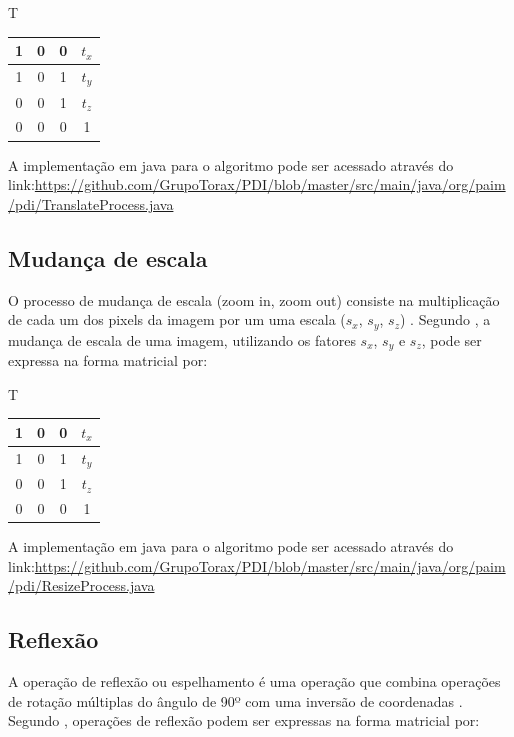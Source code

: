 \documentclass[
	12pt,				%
	oneside,			%
	a4paper,			%
	english,			%
	french,				%
	spanish,			%
	brazil,				%
	]{abntex2}
\begin{document}
T
\begin{tabular}{|c|c|c|c|}
	\hline
    1 & 0 & 0 & \(t_x\)   \\ \hline
	1 & 0 & 1 & \(t_y\)   \\ \hline   
	0 & 0 & 1 & \(t_z\)   \\ \hline   
	0 & 0 & 0 & 1        \\ \hline   
\end{tabular}

A implementação em java para o algoritmo pode ser acessado através do link:\url{https://github.com/GrupoTorax/PDI/blob/master/src/main/java/org/paim/pdi/TranslateProcess.java}

\subsection{Mudança de escala}

O processo de mudança de escala (zoom in, zoom out) consiste na multiplicação de cada um dos pixels da imagem por um uma escala (\(s_x\), \(s_y\), \(s_z\))  \cite{conciAzevedoLeta:2008}. Segundo \citet{pedriniSchwartz:2008}, a mudança de escala de uma imagem, utilizando os fatores \(s_x\), \(s_y\) e \(s_z\), pode ser expressa na forma matricial por:

T
\begin{tabular}{|c|c|c|c|}
	\hline
    1 & 0 & 0 & \(t_x\)   \\ \hline
	1 & 0 & 1 & \(t_y\)   \\ \hline   
	0 & 0 & 1 & \(t_z\)   \\ \hline   
	0 & 0 & 0 & 1   \\ \hline   
\end{tabular}

A implementação em java para o algoritmo pode ser acessado através do link:\url{https://github.com/GrupoTorax/PDI/blob/master/src/main/java/org/paim/pdi/ResizeProcess.java}

\subsection{Reflexão}

A operação de reflexão ou espelhamento é uma operação que combina operações de rotação múltiplas do ângulo de 90º com uma inversão de coordenadas \cite{conciAzevedoLeta:2008}. Segundo \citet{pedriniSchwartz:2008}, operações de reflexão podem ser expressas na forma matricial por:
\end{document}
